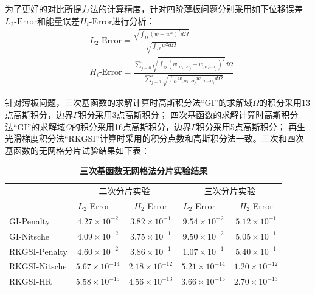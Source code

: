 为了更好的对比所提方法的计算精度，针对四阶薄板问题分别采用如下位移误差$L_2\mbox{-}\text{Error}$和能量误差$H_i\mbox{-}\text{Error}$进行分析：
\begin{equation}
\begin{split}
    &L_2\mbox{-}\text{Error}=\frac{\sqrt{\int_{\Omega}(w-w^h)^2d\Omega}}{\sqrt{\int_{\Omega}w^2d\Omega}}\\
    &H_i\mbox{-}\text{Error}=\frac{\sum_{j=0}^{i}\sqrt{\int_{\Omega}(w_{,\alpha_1\dotsb \alpha_j}-w_{,\alpha_1\dotsb \alpha_j})^2}d\Omega}{\sum_{j=0}^{i}\sqrt{\int_{\Omega}w_{,\alpha_1\dotsb \alpha_j}w_{,\alpha_1\dotsb \alpha_j}d\Omega}}
\end{split}
\end{equation}\par
针对薄板问题，三次基函数的求解计算时高斯积分法“GI”的求解域$\Omega$的积分采用13点高斯积分，边界$\Gamma$积分采用3点高斯积分；
四次基函数的求解计算时高斯积分法“GI”的求解域$\Omega$的积分采用16点高斯积分，边界$\Gamma$积分采用5点高斯积分；
再生光滑梯度积分法“RKGSI”计算时采用的积分点数和高斯积分法一致。三次和四次基函数的无网格分片试验结果如下表：
\begin{table}[H]
    \caption{\textbf{三次基函数无网格法分片实验结果}}
    \centering\label{PPcubic}
   \begin{tabular}{lcccc}
   \toprule
   & \multicolumn{2}{c}{二次分片实验} & \multicolumn{2}{c}{三次分片实验} \\ \cline{2-5}
   &$L_2$-Error$\quad$&$H_2$-Error&$L_2$-Error$\quad$&$H_2$-Error\\
   \midrule
   GI-Penalty&$4.27\times10^{-2}$&$3.82\times10^{-1}$&$9.54\times10^{-2}$&$5.12\times10^{-1}$\\
   GI-Nitsche&$4.09\times10^{-2}$&$3.75\times10^{-1}$&$9.50\times10^{-2}$&$5.05\times10^{-1}$\\
  RKGSI-Penalty&$4.60\times10^{-2}$&$3.86\times10^{-1}$&$1.07\times10^{-1}$&$5.40\times10^{-1}$\\
  RKGSI-Nitsche&$5.67\times10^{-14}$&$2.18\times10^{-12}$&$5.21\times10^{-14}$&$1.20\times10^{-12}$\\
  RKGSI-HR&$5.58\times10^{-15}$&$4.56\times10^{-13}$&$3.66\times10^{-15}$&$2.70\times10^{-13}$\\
   \bottomrule
   \end{tabular}
   \end{table}
